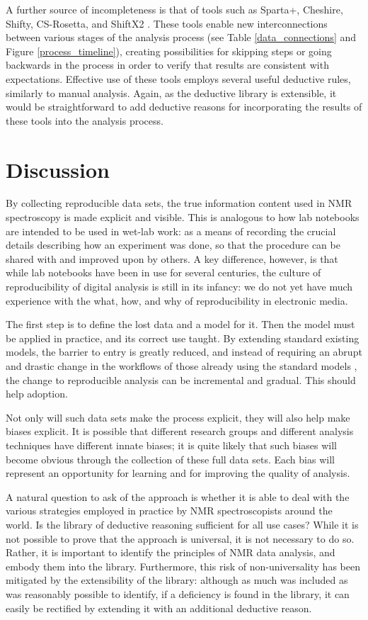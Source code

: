 A further source of incompleteness is that of tools such as Sparta+, Cheshire, 
Shifty, CS-Rosetta, and ShiftX2 \cite{sparta+, cheshire, shiftx2, cs-rosetta, shifty}.
These tools enable new interconnections between various stages of the analysis
process (see Table \ref{data_connections} and Figure \ref{process_timeline}), 
creating possibilities for skipping steps or going backwards in the
process in order to verify that results are consistent with expectations.  
Effective use of these tools employs several useful deductive rules, similarly
to manual analysis.  Again, as the deductive library is extensible, it would be
straightforward to add deductive reasons for incorporating the results of these
tools into the analysis process.


\section{Discussion}
By collecting reproducible data sets, the true information content used in
NMR spectroscopy is made explicit and visible.  This is analogous to how lab
notebooks are intended to be used in wet-lab work: as a means of recording
the crucial details describing how an experiment was done, so that the procedure
can be shared with and improved upon by others.  A key difference, however, is
that while lab notebooks have been in use for several centuries, the culture
of reproducibility of digital analysis is still in its infancy: we do not yet
have much experience with the what, how, and why of reproducibility in 
electronic media.

The first step is to define the lost data and a model for it.
Then the model must be applied in practice, and its correct use taught.
By extending standard existing models, the barrier to entry is greatly reduced,
and instead of requiring an abrupt and drastic change in the workflows of those
already using the standard models \cite{bmrb, ccpn}, the change to reproducible
analysis can be incremental and gradual.  This should help adoption.

Not only will such data sets make the process explicit, they will also help
make biases explicit.  It is possible that different research groups and
different analysis techniques have different innate biases; it is quite likely
that such biases will become obvious through the collection of these full data
sets.  Each bias will represent an opportunity for learning and for improving
the quality of analysis.

A natural question to ask of the approach is whether it is able to deal with 
the various strategies employed in practice by NMR spectroscopists around the
world.  Is the library of deductive reasoning sufficient for all use cases?
While it is not possible to prove that the approach is universal, it is not
necessary to do so.  Rather, it is important to identify the principles of
NMR data analysis, and embody them into the library.  Furthermore, this risk
of non-universality has been mitigated by the extensibility of the library:
although as much was included as was reasonably possible to identify, if 
a deficiency is found in the library, it can easily be rectified by extending
it with an additional deductive reason.


